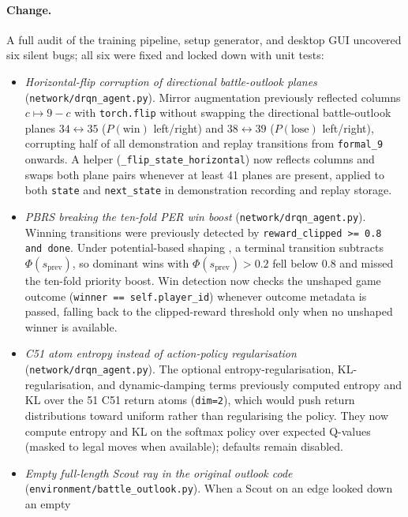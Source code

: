 \paragraph{Change.} A full audit of the training pipeline, setup generator, and desktop GUI
uncovered six silent bugs; all six were fixed and locked down with unit tests:
\begin{itemize}
  \item \emph{Horizontal-flip corruption of directional battle-outlook planes}
        (\texttt{network/drqn\_agent.py}). Mirror augmentation previously reflected columns
        $c \mapsto 9 - c$ with \texttt{torch.flip} without swapping the directional battle-outlook
        planes $34 \leftrightarrow 35$ ($P(\text{win})$ left/right) and $38 \leftrightarrow 39$
        ($P(\text{lose})$ left/right), corrupting half of all demonstration and replay transitions
        from \texttt{formal\_9} onwards. A helper (\texttt{\_flip\_state\_horizontal}) now reflects
        columns and swaps both plane pairs whenever at least 41 planes are present, applied to
        both \texttt{state} and \texttt{next\_state} in demonstration recording and replay storage.
  \item \emph{PBRS breaking the ten-fold PER win boost} (\texttt{network/drqn\_agent.py}).
        Winning transitions were previously detected by \texttt{reward\_clipped >= 0.8 and done}.
        Under potential-based shaping \cite{NgPBRS}, a terminal transition subtracts
        $\Phi(s_{\text{prev}})$, so dominant wins with $\Phi(s_{\text{prev}}) > 0.2$ fell below
        0.8 and missed the ten-fold priority boost. Win detection now checks the unshaped game
        outcome (\texttt{winner == self.player\_id}) whenever outcome metadata is passed, falling
        back to the clipped-reward threshold only when no unshaped winner is available.
  \item \emph{C51 atom entropy instead of action-policy regularisation}
        (\texttt{network/drqn\_agent.py}). The optional entropy-regularisation, KL-regularisation,
        and dynamic-damping terms previously computed entropy and KL over the 51 C51 return atoms
        \cite{C51} (\texttt{dim=2}), which would push return distributions toward uniform rather
        than regularising the policy. They now compute entropy and KL on the softmax policy over
        expected Q-values (masked to legal moves when available); defaults remain disabled.
  \item \emph{Empty full-length Scout ray in the original outlook code}
        (\texttt{environment/battle\_outlook.py}). When a Scout on an edge looked down an empty

\end{itemize}
